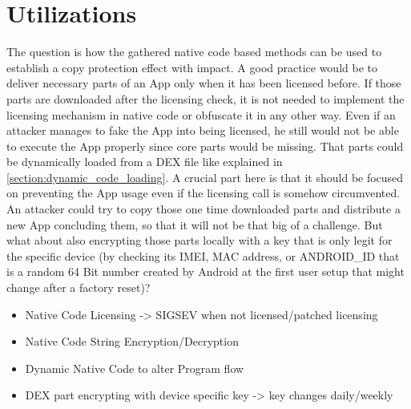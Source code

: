 \section{Utilizations}
The question is how the gathered native code based methods can be used to establish a copy protection effect with impact.
A good practice would be to deliver necessary parts of an App only when
it has been licensed before. If those parts are downloaded after the licensing
check, it is not needed to implement the licensing mechanism in native code or
obfuscate it in any other way.
Even if an attacker manages to fake the App into being licensed, he still would
not be able to execute the App properly since core parts would be missing.
That parts could be dynamically loaded from a DEX file like explained in
\autoref{section:dynamic_code_loading}. A crucial part here is that it should
be focused on preventing the App usage even if the licensing call is somehow
circumvented. An attacker could try to copy those one time downloaded parts and distribute a new App concluding them, so that it will not be that big of
a challenge. But what about also encrypting those parts locally with a key that
is only legit for the specific device (by checking its IMEI, MAC address, or
ANDROID\_ID that is a random 64 Bit number created by Android at the first user setup that might change after a factory reset)?



\begin{itemize}
\item Native Code Licensing -> SIGSEV when not licensed/patched licensing
\item Native Code String Encryption/Decryption
\item Dynamic Native Code to alter Program flow
\item DEX part encrypting with device specific key -> key changes daily/weekly
\end{itemize}
